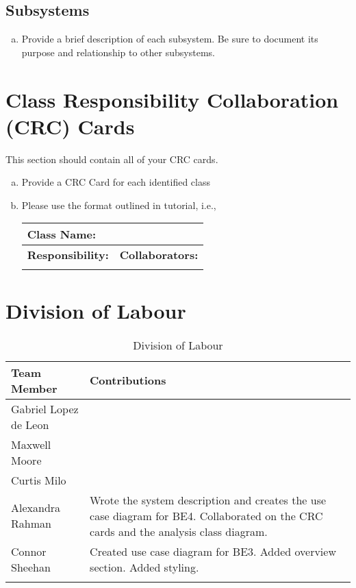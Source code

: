 \documentclass[titlepage]{article}
\begin{document}
\subsection{Subsystems}
\label{sub:subsystems}
\begin{enumerate}[a)]
	\item Provide a brief description of each subsystem. Be sure to document its purpose and relationship to other subsystems.
\end{enumerate}

	
\section{Class Responsibility Collaboration (CRC) Cards}
\label{sec:class_responsibility_collaboration_crc_cards}
This section should contain all of your CRC cards.

\begin{enumerate}[a)]
	\item Provide a CRC Card for each identified class
	\item Please use the format outlined in tutorial, i.e., 
	\begin{table}[ht]
		\centering
		\begin{tabular}{|p{5cm}|p{5cm}|}
		\hline 
		 \multicolumn{2}{|l|}{\textbf{Class Name:}} \\
		\hline
		\textbf{Responsibility:} & \textbf{Collaborators:} \\
		\hline
		\vspace{1in} & \\
		\hline
		\end{tabular}
	\end{table}
	
\end{enumerate}
\newpage

\appendix
\section{Division of Labour}
\label{sec:division_of_labour}
\begin{longtable}{| p{} | p{} |}
			\hline
			\textbf {Team Member} & \textbf{Contributions}\\ 
			\hline
			Gabriel Lopez de Leon &  %
			\\
			\hline
			Maxwell Moore & %
			\\
			\hline
			Curtis Milo & %
			\\ 
			\hline
			Alexandra Rahman & Wrote the system description and creates the use case diagram for BE4. Collaborated on the CRC cards and the analysis class diagram.
			\\
			\hline
			Connor Sheehan & Created use case diagram for BE3. Added overview section. Added styling.\\
			\hline
			
			\caption{Division of Labour}
		\end{longtable}
\end{document}
